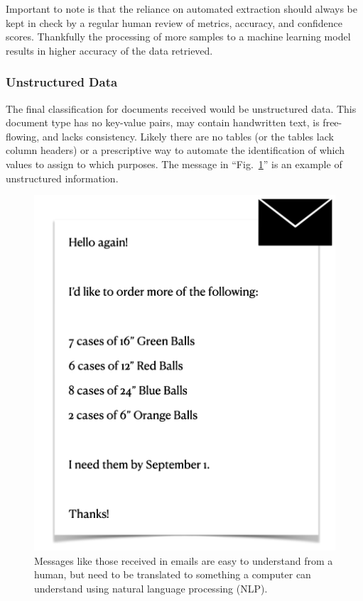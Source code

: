 \documentclass[conference]{IEEEtran}
\begin{document}
Important to note is that the reliance on automated extraction should always be kept in check by a regular human review of metrics, accuracy, and confidence scores. Thankfully the processing of more samples to a machine learning model results in higher accuracy of the data retrieved.

\subsubsection{Unstructured Data}
The final classification for documents received would be unstructured data. This document type has no key-value pairs, may contain handwritten text, is free-flowing, and lacks consistency. Likely there are no tables (or the tables lack column headers) or a prescriptive way to automate the identification of which values to assign to which purposes. The message in ``Fig.~\ref{figUnstructuredEmailExample}'' is an example of unstructured information.

\begin{figure}[ht]
\centerline{\includegraphics[width=\columnwidth]{UnstructuredEmailExample.png}}
\caption{Messages like those received in emails are easy to understand from a human, but need to be translated to something a computer can understand using natural language processing (NLP).}
\label{figUnstructuredEmailExample}
\end{figure}
\end{document}

